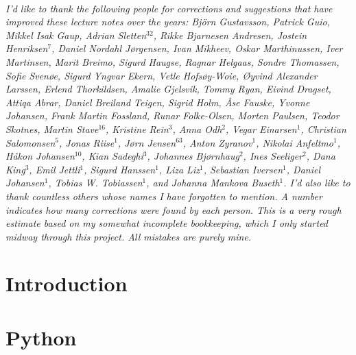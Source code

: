 \documentclass{tufte-book}
\begin{document}
\cleardoublepage
~\vfill
\begin{doublespace}
\noindent\fontsize{10}{10}\selectfont\itshape
\nohyphenation
I'd like to thank the following people for corrections and suggestions
that have improved these lecture notes over the years: Björn
Gustavsson, Patrick Guio,
Mikkel Isak Gaup, Adrian Sletten$^{32}$,
Rikke Bjarnesen Andresen, Jostein Henriksen$^7$, Daniel Nordahl Jørgensen,
Ivan Mikheev, Oskar Marthinussen, Iver Martinsen, Marit Breimo, Sigurd
Haugse, Ragnar Helgaas, Sondre Thomassen, Sofie Svenøe, Sigurd Yngvar
Ekern, Vetle Hofsøy-Woie, Øyvind Alexander Larssen, Erlend
Thorkildsen, Amalie Gjelsvik, Tommy Ryan, Eivind Dragset, Attiqa
Abrar, Daniel Breiland Teigen, Sigrid Holm, Åse Fauske, Yvonne
Johansen, Frank Martin Fossland, Runar Folke-Olsen, Morten Paulsen,
Teodor Skotnes,
Martin Stave$^{16}$, Kristine Rein$^{3}$, Anna Odh$^{2}$, Vegar
Einarsen$^{1}$, Christian Salomonsen$^{5}$, Jonas Riise$^{1}$, Jørn
Jensen$^{63}$, Anton Zyranov$^{1}$, Nikolai Anfeltmo$^{1}$, Håkon
Johansen$^{10}$, Kian Sadeghi$^{3}$, Johannes Bjørnhaug$^{2}$, Ines
Seeliger$^{2}$, Dana King$^{3}$, Emil Jettli$^{1}$, Sigurd
Hanssen$^{1}$, Liza Liz$^{1}$, Sebastian Iversen$^{1}$, Daniel
Johansen$^{1}$, Tobias W. Tobiassen$^{1}$, and Johanna Mankova
Buseth$^{1}$. I'd also like to thank countless others whose names I
have forgotten to mention. A number indicates how many corrections were
found by each person. This is a very rough estimate based on my
somewhat incomplete bookkeeping, which I only started midway through
this project. All mistakes are purely mine.
\end{doublespace}
\vfill
\vfill





\cleardoublepage


\ifSpIntro
\chapter{Introduction}

\fi

\ifSpPython
\chapter{Python} 


 \ifSpExerciseSol
   
 \fi
\fi
\end{document}
